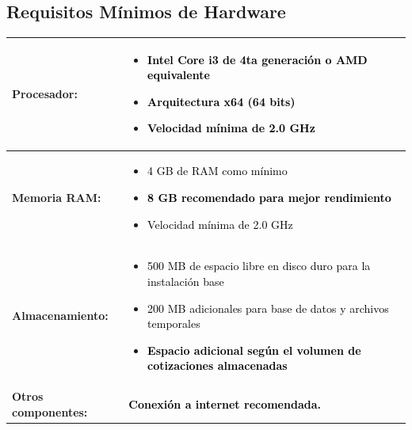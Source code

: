 \documentclass{Pretexto/bluereport}
\begin{document}
\subsection{Requisitos Mínimos de Hardware}
\begin{center}
\begin{tcolorbox}[
    enhanced,
    boxrule=2pt,
    colframe=primaryblue,
    colback=light,
    rounded corners=5pt,
    width=0.98\textwidth
]

\renewcommand{\arraystretch}{1.6}
\begin{tabular}{>{\raggedright\bfseries}p{3.5cm} 
                >{\raggedright\arraybackslash}p{9.5cm}}

\textcolor{primaryblue}{Procesador:} & 
\begin{minipage}[t]{9cm}
\vspace{-0.3cm}
\begin{itemize}[leftmargin=10pt, itemsep=2pt]
    \item \textcolor{black}{Intel Core i3 de 4ta generación o AMD equivalente}
    \item \textcolor{black}{Arquitectura x64 (64 bits)}
    \item \textcolor{black}{\textbf{Velocidad mínima de 2.0 GHz}}
\end{itemize}
\vspace{0.7cm}
\end{minipage} \\[8pt]
\hline
\textcolor{primaryblue}{Memoria RAM:} & 
\begin{minipage}[t]{9cm}
\vspace{-0.3cm}
\begin{itemize}[leftmargin=10pt, itemsep=2pt]
    \item \textcolor{black}{4 GB de RAM como mínimo}
    \item \textcolor{black}{\textbf{8 GB recomendado para mejor rendimiento}}
    \item \textcolor{black}{Velocidad mínima de 2.0 GHz}
\end{itemize}
\vspace{0.7cm}
\end{minipage} \\[8pt]
\hline
\textcolor{primaryblue}{Almacenamiento:} & 
\begin{minipage}[t]{9cm}
\vspace{-0.3cm}
\begin{itemize}[leftmargin=10pt, itemsep=2pt]
    \item \textcolor{black}{500 MB de espacio libre en disco duro para la instalación base}
    \item \textcolor{black}{200 MB adicionales para base de datos y archivos temporales}
    \item \textcolor{black}{\textbf{Espacio adicional según el volumen de cotizaciones almacenadas}}
\end{itemize}
\vspace{0.7cm}
\end{minipage} \\[8pt]
\hline
\textcolor{primaryblue}{Otros componentes:} & 
\textcolor{black}{\textbf{Conexión a internet recomendada.}} \\[5pt]


\end{tabular}
\end{tcolorbox}
\end{center}
\end{document}
